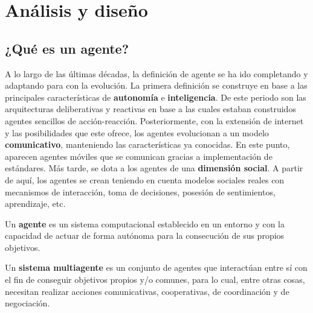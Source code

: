 \chapter{Análisis y diseño}
    \label{chap:four}

\renewcommand{\labelitemi}{$\bullet$}
\renewcommand{\labelitemii}{$\circ$}
\renewcommand{\labelitemiii}{$\Rightarrow$}

\section{¿Qué es un agente?}
A lo largo de las últimas décadas, la definición de agente se ha ido completando y adaptando para con la evolución. 
\newline La primera definición se construye en base a las principales características de \textbf{autonomía} e \textbf{inteligencia}. De este periodo son las arquitecturas deliberativas y reactivas en base a las cuales estaban construidos agentes sencillos de acción-reacción. \cite{intelligent_agents}
\newline Posteriormente, con la extensión de internet y las posibilidades que este ofrece, los agentes evolucionan a un modelo \textbf{comunicativo}, manteniendo las características ya conocidas. En este punto, aparecen agentes móviles que se comunican gracias a implementación de estándares.
\newline Más tarde, se dota a los agentes de una \textbf{dimensión social}. A partir de aquí, los agentes se crean teniendo en cuenta modelos sociales reales con mecanismos de interacción, toma de decisiones, posesión de sentimientos, aprendizaje, etc. \cite{dba2122}

Un \textbf{agente} es un sistema computacional establecido en un entorno y con la capacidad de actuar de forma autónoma para la consecución de sus propios objetivos. \cite{intelligent_agents, agentdevelopment}

Un \textbf{sistema multiagente} es un conjunto de agentes que interactúan entre sí con el fin de conseguir objetivos propios y/o comunes, para lo cual, entre otras cosas, necesitan realizar acciones comunicativas, cooperativas, de coordinación y de negociación. \cite{wooldridge2009introduction, dba2122}

\newpage
